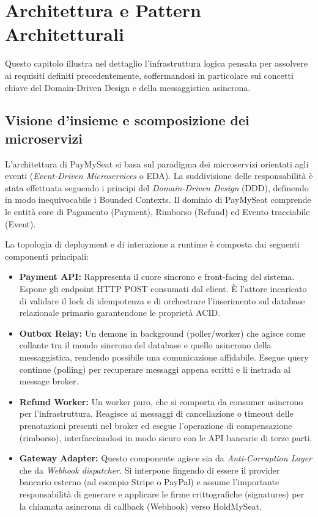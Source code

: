 \documentclass[11pt,a4paper]{report}
\begin{document}
\chapter{Architettura e Pattern Architetturali}

Questo capitolo illustra nel dettaglio l'infrastruttura logica pensata per assolvere ai requisiti definiti precedentemente, soffermandosi in particolare sui concetti chiave del Domain-Driven Design e della messaggistica asincrona.

\section{Visione d'insieme e scomposizione dei microservizi}
L'architettura di PayMySeat si basa sul paradigma dei microservizi orientati agli eventi (\textit{Event-Driven Microservices} o EDA). La suddivisione delle responsabilit\`a \`e stata effettuata seguendo i principi del \textit{Domain-Driven Design} (DDD), definendo in modo inequivocabile i Bounded Contexts. Il dominio di PayMySeat comprende le entit\`a core di Pagamento (Payment), Rimborso (Refund) ed Evento tracciabile (Event).

La topologia di deployment e di interazione a runtime \`e composta dai seguenti componenti principali:
\begin{itemize}
    \item \textbf{Payment API:} Rappresenta il cuore sincrono e front-facing del sistema. Espone gli endpoint HTTP POST consumati dal client. \`E l'attore incaricato di validare il lock di idempotenza e di orchestrare l'inserimento sul database relazionale primario garantendone le propriet\`a ACID.
    \item \textbf{Outbox Relay:} Un demone in background (poller/worker) che agisce come collante tra il mondo sincrono del database e quello asincrono della messaggistica, rendendo possibile una comunicazione affidabile. Esegue query continue (polling) per recuperare messaggi appena scritti e li instrada al message broker.
    \item \textbf{Refund Worker:} Un worker puro, che si comporta da consumer asincrono per l'infrastruttura. Reagisce ai messaggi di cancellazione o timeout delle prenotazioni presenti nel broker ed esegue l'operazione di compensazione (rimborso), interfacciandosi in modo sicuro con le API bancarie di terze parti.
    \item \textbf{Gateway Adapter:} Questo componente agisce sia da \textit{Anti-Corruption Layer} che da \textit{Webhook dispatcher}. Si interpone fingendo di essere il provider bancario esterno (ad esempio Stripe o PayPal) e assume l'importante responsabilit\`a di generare e applicare le firme crittografiche (signatures) per la chiamata asincrona di callback (Webhook) verso HoldMySeat.
\end{itemize}
\end{document}
